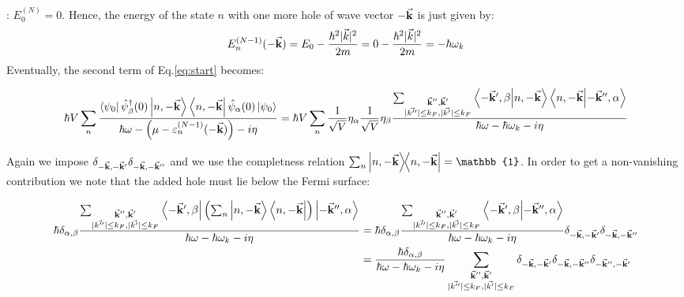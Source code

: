 \documentclass[11pt, a4paper, twoside, openright]{article}
\begin{document}
: \( E_0^{(N)} = 0 \). Hence, the energy of the state \( n \) with one more hole of wave vector \( -\va{k} \) is just given by:
\begin{equation*}
  E_n^{(N-1)} (-\va{k})= E_0 - \frac{\hbar^2 | \vec{k} |^2 }{2m} = 0 - \frac{\hbar^2 | \vec{k} |^2 }{2m} = -\hbar \omega _k
\end{equation*}
Eventually, the second term of Eq.\eqref{eq:start} becomes:
\begin{small}
\begin{equation*}
\begin{split}
 \hbar V \sum_{n}^{}
 \frac{
 \bra{\psi _0} \hat{\psi }_ \beta ^\dag (0) \ket{n, -\va{k}} \bra{n, -\va{k}}  \hat{\psi }_ \alpha
 (0)  \ket{\psi _0}
  }{  \hbar \omega - \qty( \mu - \varepsilon _n^{(N-1)} (-\va{k})) - i \eta }
   = \hbar V \sum_{n}^{}
   \frac{1}{\sqrt{V} } \eta _ \alpha
   \frac{1}{\sqrt{V} } \eta _ \beta \frac{
      \sum_{\substack{\va{k}'', \va{k}' \\ | \vec{k''} | \le k_F, | \vec{k'} | \le k_F  } }^{}  \braket{-\va{k}', \beta  }{n, - \va{k}}
      \braket{n, - \va{k}}{-\va{k}'', \alpha }
    }{ \hbar \omega - \hbar \omega _k - i \eta}
\end{split}
\end{equation*}
\end{small}
Again we impose \( \delta _{-\va{k},-\va{k}'} \delta _{-\va{k},-\va{k}''} \) and we use the completness relation \( \sum_{n}^{} \ketbra{n,- \va{k}}{n,- \va{k}}  = \mathbb{1}  \). In order to get a non-vanishing contribution we note that the added hole must lie below the Fermi surface:
\begin{small}
\begin{equation*}
\begin{split}
 \hbar
  \delta _{\alpha,\beta  } \frac{
      \sum_{\substack{\va{k}'', \va{k}' \\ | \vec{k''} | \le k_F, | \vec{k'} | \le k_F  } }^{}  \bra{-\va{k}', \beta  } \qty( \sum_{n}^{} \ket{n,- \va{k}}
      \bra{n,- \va{k}} ) \ket{-\va{k}'', \alpha }
    }{ \hbar \omega - \hbar \omega _k - i \eta}
   &=
    \hbar
     \delta _{\alpha,\beta  } \frac{
         \sum_{\substack{\va{k}'', \va{k}' \\ | \vec{k''} | \le k_F, | \vec{k'} | \le k_F  } }^{}  \bra{-\va{k}', \beta  } \ket{-\va{k}'', \alpha }
       }{ \hbar \omega - \hbar \omega _k - i \eta}
       \delta _{-\va{k},-\va{k}'} \delta _{-\va{k},-\va{k}''} \\
  &=
   \frac{\hbar
    \delta _{\alpha,\beta  }
     }{ \hbar \omega - \hbar \omega _k - i \eta}
     \sum_{\substack{\va{k}'', \va{k}' \\ | \vec{k''} | \le k_F, | \vec{k'} | \le k_F  } }^{}
     \delta _{-\va{k},-\va{k}'} \delta _{-\va{k},-\va{k}''} \delta _{-\va{k}'',-\va{k}'}
\end{split}
\end{equation*}
\end{small}
\end{document}
